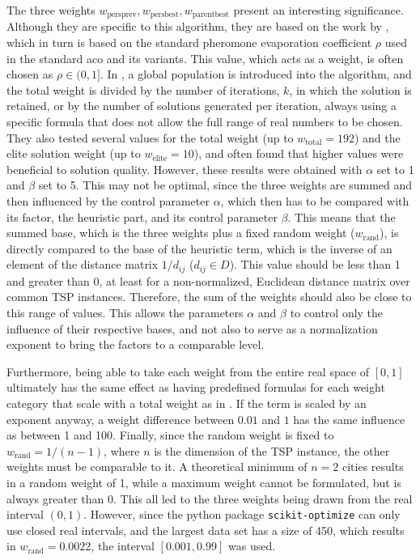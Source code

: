 The three weights $w_{\text{persprev}}, w_{\text{persbest}}, w_{\text{parentbest}}$ present an interesting significance. Although they are specific to this algorithm, they are based on the work by \citet{lin2015simple}, which in turn is based on the standard pheromone evaporation coefficient $\rho$ used in the standard \glsdesc{aco} and its variants. This value, which acts as a weight, is often chosen as $\rho \in (0,1]$. In \cite{lin2015simple}, a global population is introduced into the algorithm, and the total weight is divided by the number of iterations, $k$, in which the solution is retained, or by the number of solutions generated per iteration, always using a specific formula that does not allow the full range of real numbers to be chosen. They also tested several values for the total weight (up to $w_\text{total} = 192$) and the elite solution weight (up to $w_\text{elite} = 10$), and often found that higher values were beneficial to solution quality. However, these results were obtained with $\alpha$ set to 1 and $\beta$ set to 5. This may not be optimal, since the three weights are summed and then influenced by the control parameter $\alpha$, which then has to be compared with its factor, the heuristic part, and its control parameter $\beta$. This means that the summed base, which is the three weights plus a fixed random weight ($w_\text{rand}$), is directly compared to the base of the heuristic term, which is the inverse of an element of the distance matrix $1 / d_{ij}$ ($d_{ij} \in D$). This value should be less than 1 and greater than 0, at least for a non-normalized, Euclidean distance matrix over common TSP instances. Therefore, the sum of the weights should also be close to this range of values. This allows the parameters $\alpha$ and $\beta$ to control only the influence of their respective bases, and not also to serve as a normalization exponent to bring the factors to a comparable level.

Furthermore, being able to take each weight from the entire real space of $[0,1]$ ultimately has the same effect as having predefined formulas for each weight category that scale with a total weight as in \cite{lin2015simple}. If the term is scaled by an exponent anyway, a weight difference between $0.01$ and $1$ has the same influence as between 1 and 100. Finally, since the random weight is fixed to $w_\text{rand} = 1/(n-1)$, where $n$ is the dimension of the TSP instance, the other weights must be comparable to it. A theoretical minimum of $n = 2$ cities results in a random weight of 1, while a maximum weight cannot be formulated, but is always greater than 0. This all led to the three weights being drawn from the real interval $(0, 1)$. However, since the python package \texttt{scikit-optimize} can only use closed real intervals, and the largest data set has a size of 450, which results in $w_\text{rand} = 0.0022$, the interval $[0.001,0.99]$ was used.

